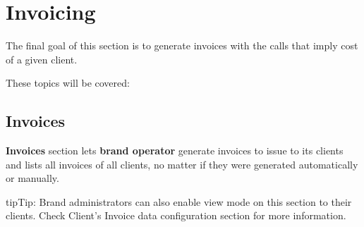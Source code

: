 \documentclass[letterpaper,10pt,english]{sphinxmanual}
\begin{document}
\section{Invoicing}
\label{administration_portal/brand/invoicing/index::doc}\label{administration_portal/brand/invoicing/index:invoicing}
The final goal of this section is to generate invoices with the calls that imply
cost of a given client.

These topics will be covered:


\subsection{Invoices}
\label{administration_portal/brand/invoicing/invoices:invoices}\label{administration_portal/brand/invoicing/invoices::doc}
\textbf{Invoices} section lets \textbf{brand operator} generate invoices to issue to its clients and lists all invoices of all
clients, no matter if they were generated automatically or manually.

\begin{notice}{tip}{Tip:}
Brand administrators can also enable view mode on this section to their clients. Check Client's Invoice data
configuration section for more information.
\end{notice}
\end{document}
